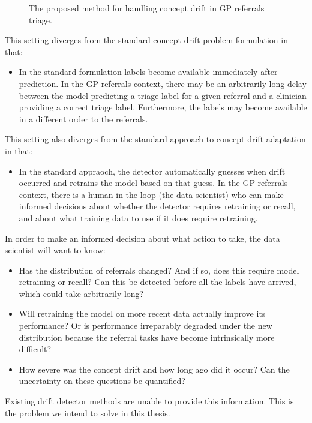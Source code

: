 \begin{figure}
    \caption{The proposed method for handling concept drift in GP referrals triage.}
    \label{fig:referrals_triage}
\end{figure}

This setting diverges from the standard concept drift problem formulation in that:
\begin{itemize}
  \item In the standard formulation labels become available immediately after prediction. In the GP referrals context, there may be an arbitrarily long delay between the model predicting a triage label for a given referral and a clinician providing a correct triage label. Furthermore, the labels may become available in a different order to the referrals.
\end{itemize}
This setting also diverges from the standard approach to concept drift adaptation in that:
\begin{itemize}
  \item In the standard appraoch, the detector automatically guesses when drift occurred and retrains the model based on that guess. In the GP referrals context, there is a human in the loop (the data scientist) who can make informed decisions about whether the detector requires retraining or recall, and about what training data to use if it does require retraining.
\end{itemize}

In order to make an informed decision about what action to take, the data scientist will want to know:
\begin{itemize}
  \item Has the distribution of referrals changed? And if so, does this require model retraining or recall? Can this be detected before all the labels have arrived, which could take arbitrarily long?
  \item Will retraining the model on more recent data actually improve its performance? Or is performance irreparably degraded under the new distribution because the referral tasks have become intrinsically more difficult?
  \item How severe was the concept drift and how long ago did it occur? Can the uncertainty on these questions be quantified?
\end{itemize}
Existing drift detector methods are unable to provide this information. This is the problem we intend to solve in this thesis.

